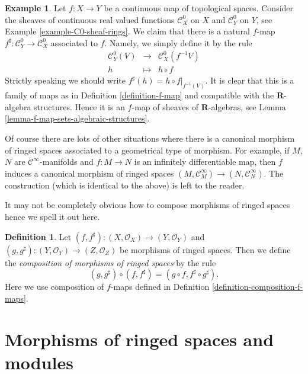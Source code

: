 \documentclass{stacks-project}
\theoremstyle{plain}
\theoremstyle{definition}
\newtheorem{definition}[subsection]{Definition}
\newtheorem{example}[subsection]{Example}
\theoremstyle{remark}
\numberwithin{equation}{subsection}
\begin{document}
\begin{example}
\label{example-continuous-map-ringed}
Let $f : X \to Y$ be a continuous map of topological spaces.
Consider the sheaves of continuous real valued functions
$\mathcal{C}^0_X$ on $X$ and $\mathcal{C}^0_Y$ on $Y$,
see Example \ref{example-C0-sheaf-rings}. We claim that there
is a natural $f$-map $f^\sharp : \mathcal{C}^0_Y \to \mathcal{C}^0_X$
associated to $f$. Namely, we simply define it by the
rule
\begin{eqnarray*}
\mathcal{C}^0_Y(V) & \longrightarrow & \mathcal{C}^0_X(f^{-1}V) \\
h & \longmapsto & h \circ f
\end{eqnarray*}
Strictly speaking we should write $f^\sharp(h) = h \circ f|_{f^{-1}(V)}$.
It is clear that this is a family of maps as in
Definition \ref{definition-f-map} and compatible with the $\mathbf{R}$-algebra
structures. Hence it is an $f$-map of sheaves of $\mathbf{R}$-algebras, see
Lemma \ref{lemma-f-map-sets-algebraic-structures}.

\medskip\noindent
Of course there are lots of other situations where there is
a canonical morphism of ringed spaces associated to a geometrical
type of morphism. For example, if $M$, $N$ are $\mathcal{C}^\infty$-manifolds
and $f : M \to N$ is an infinitely differentiable map, then
$f$ induces a canonical morphism of ringed spaces
$(M, \mathcal{C}_M^\infty) \to (N, \mathcal{C}^\infty_N)$.
The construction (which is identical to the above) is left
to the reader.
\end{example}

\noindent
It may not be completely obvious how to compose morphisms of
ringed spaces hence we spell it out here.

\begin{definition}
\label{definition-composition-maps-ringed-spaces}
Let
$(f, f^\sharp) : (X, \mathcal{O}_X) \to (Y, \mathcal{O}_Y)$ and
$(g, g^\sharp) : (Y, \mathcal{O}_Y) \to (Z, \mathcal{O}_Z)$
be morphisms of ringed spaces. Then we define
the {\it composition of morphisms of ringed spaces}
by the rule
$$
(g, g^\sharp) \circ (f, f^\sharp) = (g \circ f, f^\sharp \circ g^\sharp).
$$
Here we use composition of $f$-maps defined in
Definition \ref{definition-composition-f-maps}.
\end{definition}


\section{Morphisms of ringed spaces and modules}
\label{section-ringed-spaces-functoriality-modules}
\end{document}
